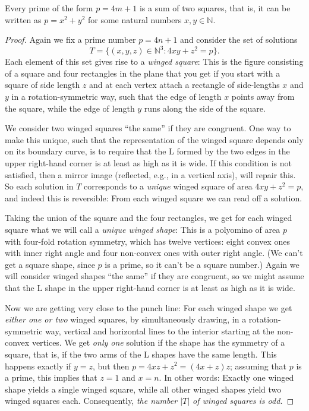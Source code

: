 \begin{proposition}
  \label{ch4.proposition3}
  Every prime of the form \(p = 4m + 1\) is a sum of two squares,
  that is, it can be written as \(p = x^2 + y^2\) for some natural numbers \(x,y \in \mathbb{N}\).
\end{proposition}
\begin{proof}
    Again we fix a prime number $p = 4n + 1$ and consider the set of solutions
\[
T = \{(x, y, z) \in \mathbb{N}^3 : 4xy + z^2 = p\}.
\]
Each element of this set gives rise to a \emph{winged square}: This is the figure consisting of a
square and four rectangles in the plane that you get if you start with a square of side length $z$
and at each vertex attach a rectangle of side-lengths $x$ and $y$ in a rotation-symmetric way,
such that the edge of length $x$ points away from the square, while the edge of length $y$ runs
along the side of the square.

We consider two winged squares ``the same'' if they are congruent. One way to make this unique,
such that the representation of the winged square depends only on its boundary curve, is to require
that the L formed by the two edges in the upper right-hand corner is at least as high as it is wide.
If this condition is not satisfied, then a mirror image (reflected, e.g., in a vertical axis), will
repair this. So each solution in $T$ corresponds to a \emph{unique} winged square of area
$4xy + z^2 = p$, and indeed this is reversible: From each winged square we can read off a solution.

Taking the union of the square and the four rectangles, we get for each winged square what we will
call a \emph{unique winged shape}: This is a polyomino of area $p$ with four-fold rotation symmetry,
 which has twelve vertices: eight convex ones with inner right angle and four non-convex ones with
 outer right angle.
 (We can't get a square shape, since $p$ is a prime, so it can't be a square number.)
 Again we will consider winged shapes ``the same'' if they are congruent, so we might assume that
 the L shape in the upper right-hand corner is at least as high as it is wide.

 Now we are getting very close to the punch line: For each winged shape we get
 \emph{either one or two} winged squares, by simultaneously drawing, in a rotation-symmetric way,
 vertical and horizontal lines to the interior starting at the non-convex vertices. We get
 \emph{only one} solution if the shape has the symmetry of a square, that is, if the two arms of the
 L shapes have the same length. This happens exactly if $y = z$, but then
 $p = 4xz + z^2 = (4x + z)z$; assuming that $p$ is a prime, this implies that $z = 1$ and $x = n$.
 In other words: Exactly one winged shape yields a single winged square, while all other winged
 shapes yield two winged squares each.
 Consequently, \emph{the number $|T|$ of winged squares is odd.}


\end{proof}
